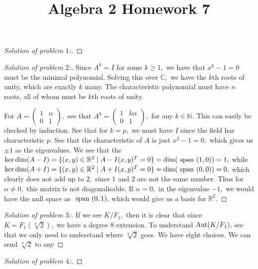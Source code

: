 \documentclass[letterpaper,11pt,twoside]{article}
\title{Algebra 2 Homework 7}
\theoremstyle{proposition}
\theoremstyle{definition}
\theoremstyle{theorem}
\theoremstyle{definition}
\theoremstyle{definition}
\theoremstyle{definition}
\theoremstyle{lemma}
\theoremstyle{definition}
\theoremstyle{definition}
\theoremstyle{corollary}
\theoremstyle{definition}
\theoremstyle{definition}
\theoremstyle{definition}
\renewcommand{\div}{\;\vert\;}
\DeclareMathOperator{\Aut}{\text{\rm Aut}}
\begin{document}
	\maketitle
	\begin{proof}[Solution of problem $1$:]
		
	\end{proof}
\begin{proof}[Solution of problem $2$:]
	Since $A^k = I$ for some $k \geq 1,$ we have that $x^k-1=0$ must be the minimal polynomial. Solving this over $\mathbb{C},$ we have the $k$th roots of 
	unity, which are exactly $k$ many. The characteristic polynomial must have $n$ roots, all of whom must be $k$th roots of unity. 
	
	For $A= \begin{pmatrix}
		1 & \alpha \\
		0 & 1
	\end{pmatrix},$ see that $A^k=  \begin{pmatrix}
	1 & k\alpha \\
	0 & 1
\end{pmatrix},$ for any $k \in \mathbb{N}.$ This can easily be checked by induction. See that for $k=p,$ we must have $I$ since the field has characteristic 
$p.$ See that the characteristic of $A$ is just $x^2-1=0,$ which gives us $\pm 1$ as the eigenvalues. We see that the $\ker \dim (A-I)= \{ (x,y) \in 
\mathbb{R}^2 \div A-I(x,y)^T=0  \}= \dim(\text{ \textrm span } (1,0))=1,$ while $\ker \dim (A+I)= \{ (x,y) \in \mathbb{R}^2 \div A+I(x,y)^T=0  \}= 
\dim(\text{ \textrm span } (0,0) )=0, $ which clearly does not add up to $2,$ since $1$ and $2$ are not the same number. Thus for $\alpha \neq 0,$ this 
matrix is not diagonalisable. If $\alpha=0,$ in the eigenvalue $-1,$ we would have the null space as $ \text{ \textrm span } (0,1),$ which would give us a 
basis for $\mathbb{R}^2.$
\end{proof}
\begin{proof}[Solution of problem $3$:]
	If we see $K/F_1,$ then it is clear that since $K= F_1(\sqrt[8]{2}),$ we have a degree $8$ extension. To understand $\Aut(K/F_1),$ see that we only need 
	to understand where $\sqrt[8]{2}$ goes. We have eight choices. We can send $\sqrt[8]{2}$ to any 
\end{proof}
\begin{proof}[Solution of problem $4$:]
	
\end{proof}
\end{document}
